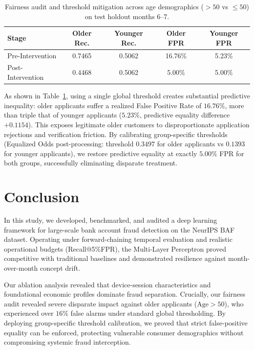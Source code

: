 \begin{table}[!t]
\centering
\caption{Fairness audit and threshold mitigation across age demographics ($>50$ vs $\le 50$) on test holdout months 6--7.}
\label{tab:fairness}
\footnotesize
\setlength{\tabcolsep}{4.5pt}
\begin{tabular}{lcccc}
\hline
Stage & Older Rec. & Younger Rec. & Older FPR & Younger FPR \\
\hline
Pre-Intervention  & 0.7465 & 0.5062 & 16.76\% & 5.23\% \\
Post-Intervention & 0.4468 & 0.5062 &  5.00\% & 5.00\% \\
\hline
\end{tabular}
\end{table}

As shown in Table~\ref{tab:fairness}, using a single global threshold creates substantial predictive inequality: older applicants suffer a realized False Positive Rate of $16.76\%$, more than triple that of younger applicants ($5.23\%$, predictive equality difference $+0.1154$). This exposes legitimate older customers to disproportionate application rejections and verification friction. By calibrating group-specific thresholds (Equalized Odds post-processing: threshold $0.3497$ for older applicants vs $0.1393$ for younger applicants), we restore predictive equality at exactly $5.00\%$ FPR for both groups, successfully eliminating disparate treatment.



\section{Conclusion}
\label{sec:conclusion}

In this study, we developed, benchmarked, and audited a deep learning framework for large-scale bank account fraud detection on the NeurIPS BAF dataset. Operating under forward-chaining temporal evaluation and realistic operational budgets (Recall@5\%FPR), the Multi-Layer Perceptron proved competitive with traditional baselines and demonstrated resilience against month-over-month concept drift.

Our ablation analysis revealed that device-session characteristics and foundational economic profiles dominate fraud separation. Crucially, our fairness audit revealed severe disparate impact against older applicants ($\text{Age} > 50$), who experienced over $16\%$ false alarms under standard global thresholding. By deploying group-specific threshold calibration, we proved that strict false-positive equality can be enforced, protecting vulnerable consumer demographics without compromising systemic fraud interception.
